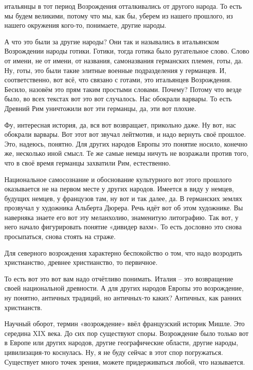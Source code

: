 итальянцы в тот период Возрождения
отталкивались от другого народа. То есть мы будем великими, потому что мы, как
бы, уберем из нашего прошлого, из нашего окружения кого-то, понимаете, другие
народы. 

А что это были за другие народы? Они так и назывались в итальянском
Возрождении народы готики. Готики, тогда готика было ругательное слово. Слово от
имени, не от имени, от названия, самоназвания германских племен, готы, да. Ну,
готы, это были такие элитные военные подразделения у германцев. И,
соответственно, вот всё, что связано с готами, это итальянцев Возрождения.
Бесило, назовём это прям таким простыми словами. Почему? Потому что везде было,
во всех текстах вот это вот случалось. Нас обокрали варвары. То есть Древний Рим
уничтожили вот эти германцы, да, эти вот плохие.

Фу, интересная история, да, вся
вот возвращает, прикольно даже. Ну вот, нас обокрали варвары. Вот этот вот
звучал лейтмотив, и надо вернуть своё прошлое. Это, надеюсь, понятно. Для других
народов Европы это понятие носило, конечно же, несколько иной смысл. Те же самые
немцы ничуть не возражали против того, что в своё время германцы захватили Рим,
естественно.

Национальное самосознание и обоснование культурного вот этого
прошлого оказывается не на первом месте у других народов. Имеется в виду у
немцев, будущих немцев, у французов там, ну вот и так далее, да. В германских
землях прозвучал у художника Альберта Дюрера. Речь идёт вот об этом художнике.
Вы наверняка знаете его вот эту меланхолию, знаменитую литографию. Так вот, у
него начало фигурировать понятие «дивидер вахм». То есть дословно это снова
просыпаться, снова стоять на страже.

Для северного возрождения
характерно беспокойство о том, что надо возродить христианство, древнее
христианство, то первичное.

То есть вот это
вот вам надо отчётливо понимать. Италия – это возвращение своей национальной
древности. А для других народов Европы это возрождение, ну понятно, античных
традиций, но античных-то каких? Античных, как ранних христианств. 

Научный
оборот, термин «возрождение» ввёл французский историк Мишле. Это середина XIX
века. До сих пор существуют споры. Возрождение было только вот в Европе или
других народов, другие географические области, другие народы, цивилизация-то
коснулась. Ну, я не буду сейчас в этот спор погружаться. Существует много точек
зрения, можете придерживаться любой, что называется. 

